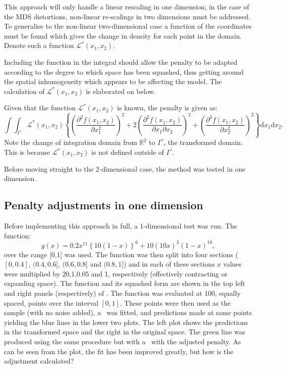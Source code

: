 This approach will only handle a linear rescaling in one dimension; in the case of the MDS distortions, non-linear re-scalings in two dimensions must be addressed. To generalise  to the non-linear two-dimensional case a function of the coordinates must be found which gives the change in density for each point in the domain. Denote such a function $\mathcal{L}^*(x_1,x_2)$. 

Including the function in the integral should allow the penalty to be adapted according to the degree to which space has been squashed, thus getting around the spatial inhomogeneity which appears to be affecting the model. The calculation of $\mathcal{L}^*(x_1,x_2)$ is elaborated on below.

Given that the function $\mathcal{L}^*(x_1,x_2)$ is known, the penalty is given as:
\begin{equation}
\int\int_{\Gamma^\prime} \mathcal{L}^*(x_1,x_2) \left \{ \left (\frac{\partial^2 f(x_1,x_2)}{\partial x_1^2}\right )^2 + 2\left (\frac{\partial^2 f(x_1,x_2)}{\partial x_1 \partial x_2}\right )^2 + \left (\frac{\partial^2 f(x_1,x_2)}{\partial x_2^2}\right )^2\right \} \text{d}x_1 \text{d}x_2.
\label{kdeadjust}
\end{equation}
Note the change of integration domain from $\mathbb{R}^2$ to $\Gamma^\prime$, the transformed domain. This is because $\mathcal{L}^*(x_1,x_2)$ is not defined outside of $\Gamma^\prime$.

Before moving straight to the 2-dimensional case, the method was tested in one dimension.

\subsection{Penalty adjustments in one dimension}

Before implementing this approach in full, a 1-dimensional test was run. The function:
\begin{equation}
g(x)=0.2x^{11}\left \{ 10(1-x) \right \}^6+10(10x)^3(1-x)^{10},
\label{hardfcn}
\end{equation}
over the range [0,1] was used. The function was then split into four sections ($[0,0.4]$, $(0.4,0.6]$, $(0.6,0.8]$ and $(0.8,1]$) and in each of these sections $x$ values were multiplied by 20,1,0.05 and 1, respectively (effectively contracting or expanding space). The function and its squashed form are shown in the top left and right panels (respectively) of . The function was evaluated at 100, equally spaced, points over the interval $[0,1]$. These points were then used as the sample (with no noise added), a \tprs\ was fitted, and predictions made at same points yielding the blue lines in the lower two plots. The left plot shows the predictions in the transformed space and the right in the original space. The green line was produced using the same procedure but with a \tprs\ with the adjusted penalty. As can be seen from the plot, the fit has been improved greatly, but how is the adjustment calculated?

